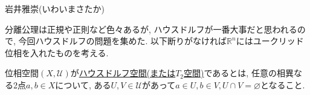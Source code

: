 \documentclass[dvipdfmx,a4paper,11pt]{article}
\newcommand{\R}{\mathbb{R}}
\theoremstyle{definition}
\begin{document}
\begin{flushright}
 岩井雅崇(いわいまさたか)
\end{flushright}

分離公理は正規や正則など色々あるが, ハウスドルフが一番大事だと思われるので, 今回ハウスドルフの問題を集めた. 以下断りがなければ$\R^{n}$にはユークリッド位相を入れたものを考える. 


  \begin{tcolorbox}[
   colback = white,
   colframe = green!35!black,
    fonttitle = \bfseries,
    breakable = true]

位相空間$(X, \mathscr{U})$が\underline{ハウスドルフ空間(または$T_2$空間)}であるとは, 任意の相異なる2点$a, b \in X$について, ある$U, V \in \mathscr{U}$があって$a \in U, b \in V, U \cap V = \varnothing $となること.

 \end{tcolorbox}
\end{document}

